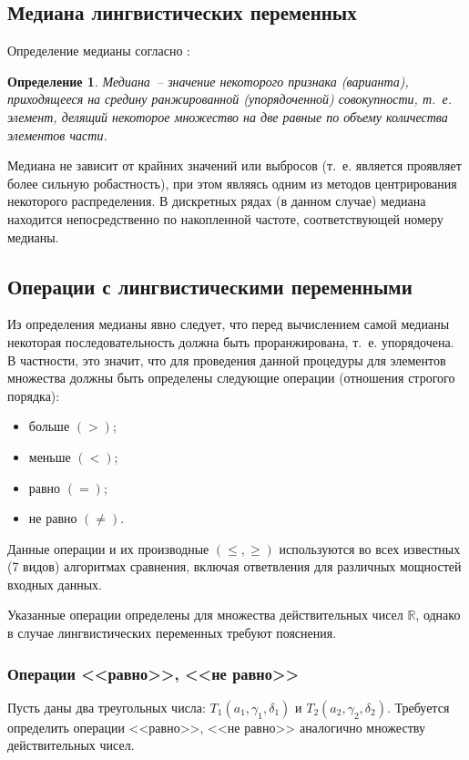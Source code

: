 \documentclass[a4paper,14pt,russian]{extreport}
\newtheorem{Def}{Определение} %
\begin{document}
\subsection{Медиана лингвистических переменных}

Определение медианы согласно :
\begin{Def}
Медиана~-- значение некоторого признака (варианта), приходящееся на средину ранжированной (упорядоченной) совокупности, т.~е. элемент, делящий некоторое множество на две равные по объему количества элементов части.
\end{Def}

Медиана не зависит от крайних значений или выбросов (т.~е. является проявляет более сильную робастность), при этом являясь одним из методов центрирования некоторого распределения. В дискретных рядах (в данном случае) медиана находится непосредственно по накопленной частоте, соответствующей номеру медианы.

\subsection{Операции с лингвистическими переменными}

Из определения медианы явно следует, что перед вычислением самой медианы некоторая последовательность должна быть проранжирована, т.~е. упорядочена. В частности, это значит, что для проведения данной процедуры для элементов множества должны быть определены следующие операции (отношения строгого порядка):
\begin{itemize}
\item больше $\left(>\right)$;
\item меньше $\left(<\right)$;
\item равно $\left(=\right)$;
\item не равно $\left(\neq\right)$.
\end{itemize}

Данные операции и их производные $\left(\leq,\geq\right)$ используются во всех известных (7 видов) алгоритмах сравнения, включая ответвления для различных мощностей входных данных.

Указанные операции определены для множества действительных чисел $\mathbb{R}$, однако в случае лингвистических переменных требуют пояснения.
\subsubsection{Операции <<равно>>, <<не равно>>}

Пусть даны два треугольных числа: $T_1\left(a_1,\gamma_1,\delta_1\right)$ и $T_2\left(a_2,\gamma_2,\delta_2\right)$. Требуется определить операции <<равно>>, <<не равно>> аналогично множеству действительных чисел.
\end{document}
